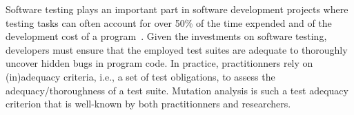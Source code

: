 Software testing plays an important part in software development projects
where testing tasks can often account for over 50\% of the time expended and
of the development cost of a program~\cite{myers2011art}. Given the
investments on software testing, developers must ensure that the employed test
suites are adequate to thoroughly uncover hidden bugs in program code. In
practice, practitionners rely on (in)adequacy criteria, i.e., a set of test
obligations, to assess the adequacy/thoroughness of a test suite. Mutation
analysis is such a test adequacy criterion that is well-known by both
practitionners and researchers.

